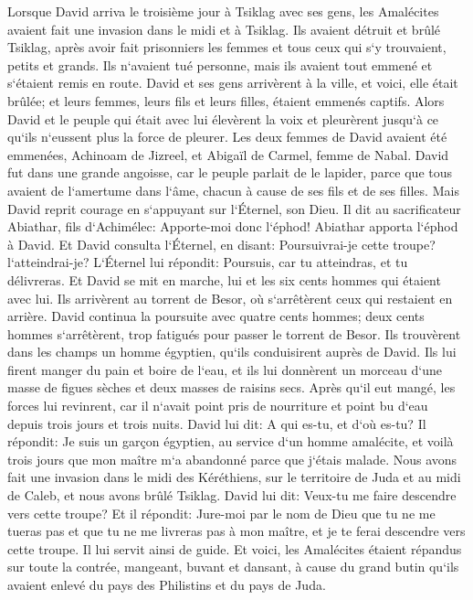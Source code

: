 \verse Lorsque David arriva le troisième jour à Tsiklag avec ses gens, les Amalécites avaient fait une invasion dans le midi et à Tsiklag. Ils avaient détruit et brûlé Tsiklag, 
\verse après avoir fait prisonniers les femmes et tous ceux qui s`y trouvaient, petits et grands. Ils n`avaient tué personne, mais ils avaient tout emmené et s`étaient remis en route. 
\verse David et ses gens arrivèrent à la ville, et voici, elle était brûlée; et leurs femmes, leurs fils et leurs filles, étaient emmenés captifs. 
\verse Alors David et le peuple qui était avec lui élevèrent la voix et pleurèrent jusqu`à ce qu`ils n`eussent plus la force de pleurer. 
\verse Les deux femmes de David avaient été emmenées, Achinoam de Jizreel, et Abigaïl de Carmel, femme de Nabal. 
\verse David fut dans une grande angoisse, car le peuple parlait de le lapider, parce que tous avaient de l`amertume dans l`âme, chacun à cause de ses fils et de ses filles. Mais David reprit courage en s`appuyant sur l`Éternel, son Dieu. 
\verse Il dit au sacrificateur Abiathar, fils d`Achimélec: Apporte-moi donc l`éphod! Abiathar apporta l`éphod à David. 
\verse Et David consulta l`Éternel, en disant: Poursuivrai-je cette troupe? l`atteindrai-je? L`Éternel lui répondit: Poursuis, car tu atteindras, et tu délivreras. 
\verse Et David se mit en marche, lui et les six cents hommes qui étaient avec lui. Ils arrivèrent au torrent de Besor, où s`arrêtèrent ceux qui restaient en arrière. 
\verse David continua la poursuite avec quatre cents hommes; deux cents hommes s`arrêtèrent, trop fatigués pour passer le torrent de Besor. 
\verse Ils trouvèrent dans les champs un homme égyptien, qu`ils conduisirent auprès de David. Ils lui firent manger du pain et boire de l`eau, 
\verse et ils lui donnèrent un morceau d`une masse de figues sèches et deux masses de raisins secs. Après qu`il eut mangé, les forces lui revinrent, car il n`avait point pris de nourriture et point bu d`eau depuis trois jours et trois nuits. 
\verse David lui dit: A qui es-tu, et d`où es-tu? Il répondit: Je suis un garçon égyptien, au service d`un homme amalécite, et voilà trois jours que mon maître m`a abandonné parce que j`étais malade. 
\verse Nous avons fait une invasion dans le midi des Kéréthiens, sur le territoire de Juda et au midi de Caleb, et nous avons brûlé Tsiklag. 
\verse David lui dit: Veux-tu me faire descendre vers cette troupe? Et il répondit: Jure-moi par le nom de Dieu que tu ne me tueras pas et que tu ne me livreras pas à mon maître, et je te ferai descendre vers cette troupe. 
\verse Il lui servit ainsi de guide. Et voici, les Amalécites étaient répandus sur toute la contrée, mangeant, buvant et dansant, à cause du grand butin qu`ils avaient enlevé du pays des Philistins et du pays de Juda. 
